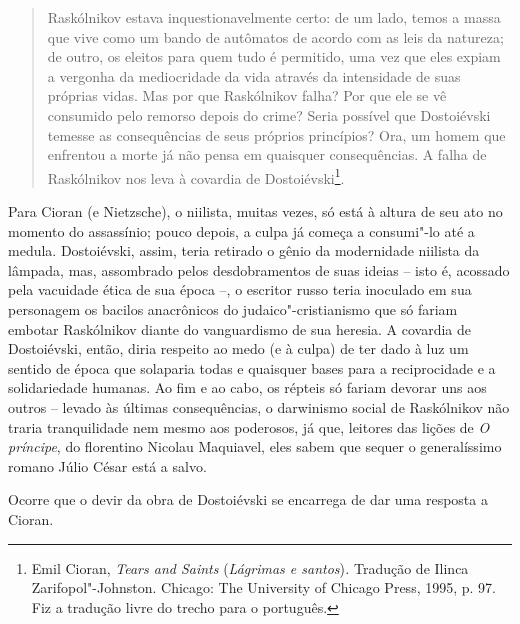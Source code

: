 \begin{quote}
Raskólnikov estava inquestionavelmente certo: de um lado, temos a massa
que vive como um bando de autômatos de acordo com as leis da natureza;
de outro, os eleitos para quem tudo é permitido, uma vez que eles expiam
a vergonha da mediocridade da vida através da intensidade de suas
próprias vidas. Mas por que Raskólnikov falha? Por que ele se vê
consumido pelo remorso depois do crime? Seria possível que Dostoiévski
temesse as consequências de seus próprios princípios? Ora, um homem que
enfrentou a morte já não pensa em quaisquer consequências. A falha de
Raskólnikov nos leva à covardia de Dostoiévski\footnote{Emil Cioran,
  \emph{Tears and Saints} (\emph{Lágrimas e santos})\emph{.} Tradução de
  Ilinca Zarifopol"-Johnston. Chicago: The University of Chicago Press,
  1995, p. 97. Fiz a tradução livre do trecho para o português.}.
\end{quote}

Para Cioran (e Nietzsche), o niilista, muitas vezes, só está à altura de
seu ato no momento do assassínio; pouco depois, a culpa já começa a
consumi"-lo até a medula. Dostoiévski, assim, teria retirado o gênio da
modernidade niilista da lâmpada, mas, assombrado pelos desdobramentos de
suas ideias -- isto é, acossado pela vacuidade ética de sua época --, o
escritor russo teria inoculado em sua personagem os bacilos anacrônicos
do judaico"-cristianismo que só fariam embotar Raskólnikov diante do
vanguardismo de sua heresia. A covardia de Dostoiévski, então, diria
respeito ao medo (e à culpa) de ter dado à luz um sentido de época que
solaparia todas e quaisquer bases para a reciprocidade e a solidariedade
humanas. Ao fim e ao cabo, os répteis só fariam devorar uns aos outros
-- levado às últimas consequências, o darwinismo social de Raskólnikov
não traria tranquilidade nem mesmo aos poderosos, já que, leitores das
lições de \emph{O príncipe}, do florentino Nicolau Maquiavel, eles sabem
que sequer o generalíssimo romano Júlio César está a salvo.

Ocorre que o devir da obra de Dostoiévski se encarrega de dar uma
resposta a Cioran.

